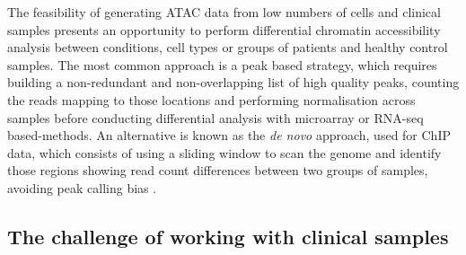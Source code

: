 The feasibility of generating ATAC data from low numbers of cells and clinical samples presents an opportunity to perform differential chromatin accessibility analysis between conditions, cell types or groups of patients and healthy control samples. The most common approach is a peak based strategy, which requires building a non-redundant and non-overlapping list of high quality peaks, counting the reads mapping to those locations and performing normalisation across samples before conducting differential analysis with microarray or RNA-seq based-methods. An alternative is known as the \textit{de novo} approach, used for ChIP data, which consists of using a sliding window to scan the genome and identify those regions showing read count differences between two groups of samples, avoiding peak calling bias \parencite{Shen2013}.     


\subsection{The challenge of working with clinical samples}

